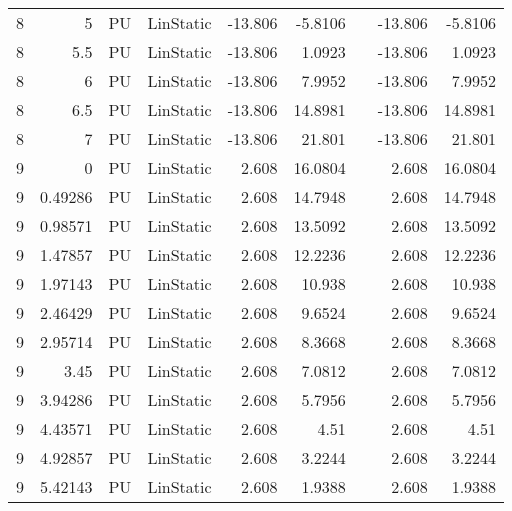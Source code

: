 \begin{table}[htbp]
{\begin{tabular}{rrrlrrrrr}
    \multicolumn{1}{l}{8} & 5   & \multicolumn{1}{l}{PU} & LinStatic & -13.806 & -5.8106 &     & -13.806 & -5.8106 \\
    \multicolumn{1}{l}{8} & 5.5 & \multicolumn{1}{l}{PU} & LinStatic & -13.806 & 1.0923 &     & -13.806 & 1.0923 \\
    \multicolumn{1}{l}{8} & 6   & \multicolumn{1}{l}{PU} & LinStatic & -13.806 & 7.9952 &     & -13.806 & 7.9952 \\
    \multicolumn{1}{l}{8} & 6.5 & \multicolumn{1}{l}{PU} & LinStatic & -13.806 & 14.8981 &     & -13.806 & 14.8981 \\
    \multicolumn{1}{l}{8} & 7   & \multicolumn{1}{l}{PU} & LinStatic & -13.806 & 21.801 &     & -13.806 & 21.801 \\
    \multicolumn{1}{l}{9} & 0   & \multicolumn{1}{l}{PU} & LinStatic & 2.608 & 16.0804 &     & 2.608 & 16.0804 \\
    \multicolumn{1}{l}{9} & 0.49286 & \multicolumn{1}{l}{PU} & LinStatic & 2.608 & 14.7948 &     & 2.608 & 14.7948 \\
    \multicolumn{1}{l}{9} & 0.98571 & \multicolumn{1}{l}{PU} & LinStatic & 2.608 & 13.5092 &     & 2.608 & 13.5092 \\
    \multicolumn{1}{l}{9} & 1.47857 & \multicolumn{1}{l}{PU} & LinStatic & 2.608 & 12.2236 &     & 2.608 & 12.2236 \\
    \multicolumn{1}{l}{9} & 1.97143 & \multicolumn{1}{l}{PU} & LinStatic & 2.608 & 10.938 &     & 2.608 & 10.938 \\
    \multicolumn{1}{l}{9} & 2.46429 & \multicolumn{1}{l}{PU} & LinStatic & 2.608 & 9.6524 &     & 2.608 & 9.6524 \\
    \multicolumn{1}{l}{9} & 2.95714 & \multicolumn{1}{l}{PU} & LinStatic & 2.608 & 8.3668 &     & 2.608 & 8.3668 \\
    \multicolumn{1}{l}{9} & 3.45 & \multicolumn{1}{l}{PU} & LinStatic & 2.608 & 7.0812 &     & 2.608 & 7.0812 \\
    \multicolumn{1}{l}{9} & 3.94286 & \multicolumn{1}{l}{PU} & LinStatic & 2.608 & 5.7956 &     & 2.608 & 5.7956 \\
    \multicolumn{1}{l}{9} & 4.43571 & \multicolumn{1}{l}{PU} & LinStatic & 2.608 & 4.51 &     & 2.608 & 4.51 \\
    \multicolumn{1}{l}{9} & 4.92857 & \multicolumn{1}{l}{PU} & LinStatic & 2.608 & 3.2244 &     & 2.608 & 3.2244 \\
    \multicolumn{1}{l}{9} & 5.42143 & \multicolumn{1}{l}{PU} & LinStatic & 2.608 & 1.9388 &     & 2.608 & 1.9388 \\

\end{tabular}}
\end{table}
